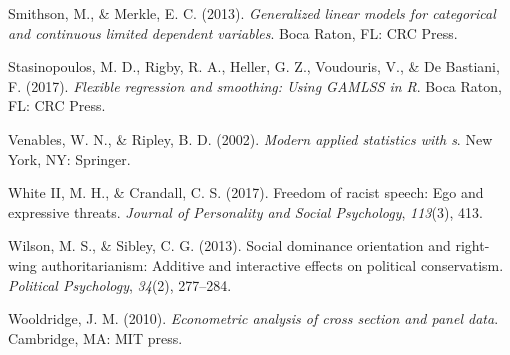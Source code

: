 \documentclass[english,man]{apa6}
\newcounter{author}
\theoremstyle{definition}
\theoremstyle{definition}
\theoremstyle{remark}
\begin{document}
\hypertarget{ref-smithson2013generalized}{}
Smithson, M., \& Merkle, E. C. (2013). \emph{Generalized linear models
for categorical and continuous limited dependent variables}. Boca Raton,
FL: CRC Press.

\hypertarget{ref-stasinopoulos2017flexible}{}
Stasinopoulos, M. D., Rigby, R. A., Heller, G. Z., Voudouris, V., \& De
Bastiani, F. (2017). \emph{Flexible regression and smoothing: Using
GAMLSS in R}. Boca Raton, FL: CRC Press.

\hypertarget{ref-venables2002modern}{}
Venables, W. N., \& Ripley, B. D. (2002). \emph{Modern applied
statistics with s}. New York, NY: Springer.

\hypertarget{ref-white2017freedom}{}
White II, M. H., \& Crandall, C. S. (2017). Freedom of racist speech:
Ego and expressive threats. \emph{Journal of Personality and Social
Psychology}, \emph{113}(3), 413.

\hypertarget{ref-wilson2013social}{}
Wilson, M. S., \& Sibley, C. G. (2013). Social dominance orientation and
right-wing authoritarianism: Additive and interactive effects on
political conservatism. \emph{Political Psychology}, \emph{34}(2),
277--284.

\hypertarget{ref-wooldridge2010econometric}{}
Wooldridge, J. M. (2010). \emph{Econometric analysis of cross section
and panel data}. Cambridge, MA: MIT press.
\end{document}
